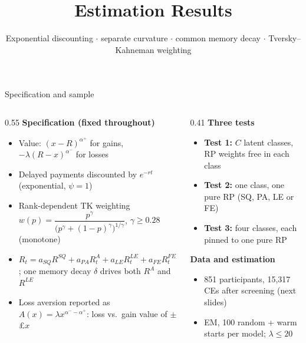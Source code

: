 \documentclass[aspectratio=169,11pt]{beamer}
\title{Estimation Results}
\subtitle{Exponential discounting $\cdot$ separate curvature $\cdot$ common memory decay $\cdot$ Tversky--Kahneman weighting}
\date{}
\newcommand{\ap}{\alpha^{+}}
\newcommand{\am}{\alpha^{-}}
\newcommand{\tight}{\setlength{\itemsep}{3pt}}
\begin{document}
\begin{frame}
  \titlepage
\end{frame}

\begin{frame}{Specification and sample}
\begin{columns}[T,onlytextwidth]
\begin{column}{0.55\textwidth}
\textbf{Specification (fixed throughout)}
\begin{itemize}\small\tight
  \item Value: $(x-R)^{\ap}$ for gains, $-\lambda(R-x)^{\am}$ for losses
  \item Delayed payments discounted by $e^{-rt}$ (exponential, $\psi=1$)
  \item Rank-dependent TK weighting $w(p)=\dfrac{p^{\gamma}}{\big(p^{\gamma}+(1-p)^{\gamma}\big)^{1/\gamma}}$, $\gamma\ge 0.28$ (monotone)
  \item $R_t=a_{SQ}R^{SQ}+a_{PA}R^{A}_t+a_{LE}R^{LE}_t+a_{FE}R^{FE}_t$; one memory decay $\delta$ drives both $R^{A}$ and $R^{LE}$
  \item Loss aversion reported as $A(x)=\lambda x^{\am-\ap}$: loss vs.\ gain value of $\pm$\pounds$x$
\end{itemize}
\end{column}
\begin{column}{0.41\textwidth}
\textbf{Three tests}
\begin{itemize}\small\tight
  \item \textbf{Test 1:} $C$ latent classes, RP weights free in each class
  \item \textbf{Test 2:} one class, one pure RP (SQ, PA, LE or FE)
  \item \textbf{Test 3:} four classes, each pinned to one pure RP
\end{itemize}
\vspace{6pt}
\textbf{Data and estimation}
\begin{itemize}\small\tight
  \item 851 participants, 15{,}317 CEs after screening (next slides)
  \item EM, 100 random + warm starts per model; $\lambda\le 20$
\end{itemize}
\end{column}
\end{columns}
\end{frame}
\end{document}
